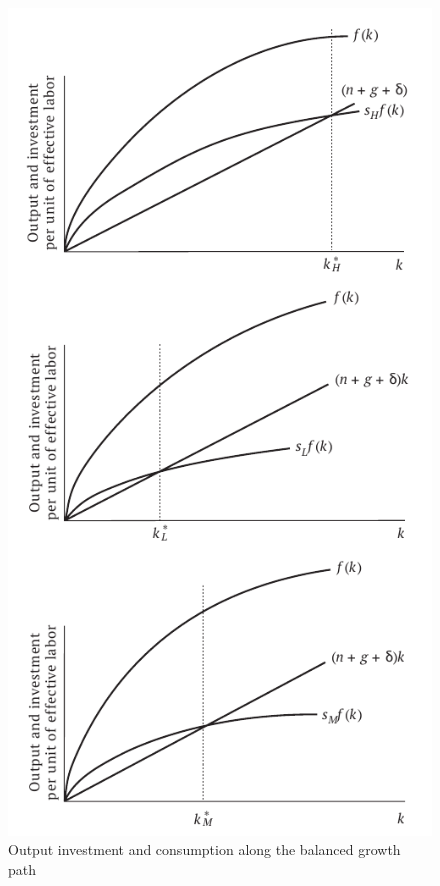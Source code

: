 \begin{figure}
    \centering
    \includegraphics{1_0_Growth_Theory/solow_graphs.pdf}
    \caption{Output investment and consumption along the balanced growth path}
    \label{fig:my_label}
\end{figure}




